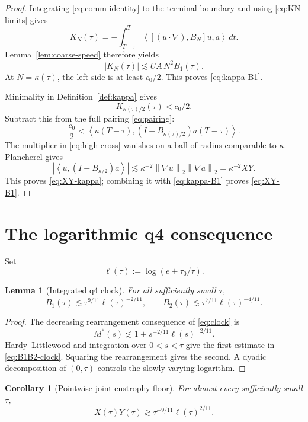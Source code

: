 \documentclass[11pt]{article}
\newtheorem{lemma}[theorem]{Lemma}
\newtheorem{corollary}[theorem]{Corollary}
\theoremstyle{remark}
\newcommand{\norm}[1]{\left\|#1\right\|}
\newcommand{\ip}[2]{\left\langle#1,#2\right\rangle}
\begin{document}
\begin{proof}
Integrating \eqref{eq:comm-identity} to the terminal boundary and using
\eqref{eq:KN-limits} gives
\[
 K_N(\tau)
 =
 -\int_{T-\tau}^T
 \ip{[(u\cdot\nabla),B_N]u}{a}\,dt.
\]
Lemma~\ref{lem:coarse-speed} therefore yields
\[
 |K_N(\tau)|
 \lesssim
 UA\,N^2B_1(\tau).
\]
At \(N=\kappa(\tau)\), the left side is at least \(c_0/2\).
This proves \eqref{eq:kappa-B1}.

Minimality in Definition~\ref{def:kappa} gives
\[
 K_{\kappa(\tau)/2}(\tau)<c_0/2.
\]
Subtract this from the full pairing \eqref{eq:pairing}:
\begin{equation}
\label{eq:high-cross}
 \frac{c_0}{2}
 <
 \ip{u(T-\tau)}
 {(I-B_{\kappa(\tau)/2})a(T-\tau)}.
\end{equation}
The multiplier in \eqref{eq:high-cross} vanishes on a ball of radius
comparable to \(\kappa\).  Plancherel gives
\[
 \left|
 \ip{u}{(I-B_{\kappa/2})a}
 \right|
 \lesssim
 \kappa^{-2}\norm{\nabla u}_2\norm{\nabla a}_2
 =
 \kappa^{-2}XY.
\]
This proves \eqref{eq:XY-kappa}; combining it with
\eqref{eq:kappa-B1} proves \eqref{eq:XY-B1}.
\end{proof}

\section{The logarithmic q4 consequence}

Set
\[
 \ell(\tau):=\log(e+\tau_0/\tau).
\]

\begin{lemma}[Integrated q4 clock]
\label{lem:clock-integrals}
For all sufficiently small \(\tau\),
\begin{equation}
\label{eq:B1B2-clock}
 \boxed{
 B_1(\tau)
 \lesssim
 \tau^{9/11}\ell(\tau)^{-2/11},
 \qquad
 B_2(\tau)
 \lesssim
 \tau^{7/11}\ell(\tau)^{-4/11}.
 }
\end{equation}
\end{lemma}

\begin{proof}
The decreasing rearrangement consequence of \eqref{eq:clock} is
\[
 M^*(s)
 \lesssim
 1+s^{-2/11}\ell(s)^{-2/11}.
\]
Hardy--Littlewood and integration over \(0<s<\tau\) give the first
estimate in \eqref{eq:B1B2-clock}.  Squaring the rearrangement gives the
second.  A dyadic decomposition of \((0,\tau)\) controls the slowly
varying logarithm.
\end{proof}

\begin{corollary}[Pointwise joint-enstrophy floor]
\label{cor:pointwise-floor}
For almost every sufficiently small \(\tau\),
\begin{equation}
\label{eq:pointwise-floor}
 \boxed{
 X(\tau)Y(\tau)
 \gtrsim
 \tau^{-9/11}\ell(\tau)^{2/11}.
 }
\end{equation}
\end{corollary}
\end{document}
